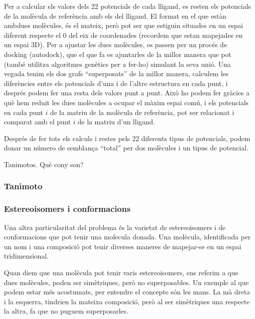 \documentclass[titlepage,a4paper,12pt]{book}
\begin{document}

Per a calcular els valors dels 22 potencials de cada lligand, es resten els
potencials de la molècula de referència amb els del lligand.  El format en el
que estàn ambdues molècules, és el mateix, però pot ser que estiguin situades en
un espai diferent respecte el 0 del eix de coordenades (recordem que estan
mapejades en un espai 3D).  Per a ajustar les dues molècules, es passen per un
procés de docking (autodock), que el que fa es ajuntarles de la millor manera que pot
(també utilitza algoritmes genètics per a fer-ho) simulant la seva unió. Una
vegada tenim els dos grafs ``superposats'' de la millor manera, calculem les
diferències entre els potencials d'una i de l'altre estructura en cada punt, i
després podem fer una resta dels valors punt a punt.  Això ho podem fer gràcies
a què hem reduit les dues molècules a ocupar el màxim espai comú, i els
potencials en cada punt $i$ de la matriu de la molècula de referència, pot ser
relacionat i comparat amb el punt $i$ de la matriu d'un lligand.

Després de fer tots els calculs i restes pels 22 diferents tipus de potencials,
podem donar un número de semblança ``total'' per dos molècules i un tipus de
potencial.

Tanimotos. Què cony son? %
\subsubsection{Tanimoto} %
\label{ssub:Tanimoto}


\subsubsection{Estereoisomers i conformacions}
\label{ssub:estereoisomers i conformacions}

Una altra particularitat del problema és la varietat de estereoisomers i de
conformacions que pot tenir una molecula donada.  Una molècula, identificada per
un nom i una composició pot tenir diverses maneres de mapejar-se en un espai
tridimensional.

Quan diem que una molècula pot tenir varis estereoisomers, ens referim a que
dues molècules, poden ser simètriques, però no superposables.  Un exemple al que
podem estar més acostumats, per entendre el concepte són les mans.  La mà dreta
i la esquerra, tindrien la mateixa composició, però al ser simètriques una
respecte la altra, fa que no puguem superposarles.
\end{document}
